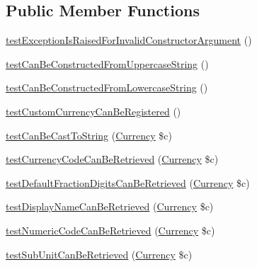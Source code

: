 \subsection*{Public Member Functions}
\begin{DoxyCompactItemize}
\item 
\hyperlink{classSebastianBergmann_1_1Money_1_1CurrencyTest_a17d231f2f0fd7811315590393b549175}{test\+Exception\+Is\+Raised\+For\+Invalid\+Constructor\+Argument} ()
\item 
\hyperlink{classSebastianBergmann_1_1Money_1_1CurrencyTest_ad3be72b37306b9f77812eeec54533606}{test\+Can\+Be\+Constructed\+From\+Uppercase\+String} ()
\item 
\hyperlink{classSebastianBergmann_1_1Money_1_1CurrencyTest_aa82d7dff3050f2a3cd07f5f015796e4d}{test\+Can\+Be\+Constructed\+From\+Lowercase\+String} ()
\item 
\hyperlink{classSebastianBergmann_1_1Money_1_1CurrencyTest_a380803c1311b8fa89696d963835093f2}{test\+Custom\+Currency\+Can\+Be\+Registered} ()
\item 
\hyperlink{classSebastianBergmann_1_1Money_1_1CurrencyTest_ad857c5bc4c304ce75db7b26a26c62a58}{test\+Can\+Be\+Cast\+To\+String} (\hyperlink{classSebastianBergmann_1_1Money_1_1Currency}{Currency} \$c)
\item 
\hyperlink{classSebastianBergmann_1_1Money_1_1CurrencyTest_a8a62f51dfe466c98f757f173e2459d2f}{test\+Currency\+Code\+Can\+Be\+Retrieved} (\hyperlink{classSebastianBergmann_1_1Money_1_1Currency}{Currency} \$c)
\item 
\hyperlink{classSebastianBergmann_1_1Money_1_1CurrencyTest_ae64969e4bab6c78e29fec1d9a63797d7}{test\+Default\+Fraction\+Digits\+Can\+Be\+Retrieved} (\hyperlink{classSebastianBergmann_1_1Money_1_1Currency}{Currency} \$c)
\item 
\hyperlink{classSebastianBergmann_1_1Money_1_1CurrencyTest_a469a205683f76b52e867f94367aec6de}{test\+Display\+Name\+Can\+Be\+Retrieved} (\hyperlink{classSebastianBergmann_1_1Money_1_1Currency}{Currency} \$c)
\item 
\hyperlink{classSebastianBergmann_1_1Money_1_1CurrencyTest_ae3a7cfb35cff2f86660961e02e027ad3}{test\+Numeric\+Code\+Can\+Be\+Retrieved} (\hyperlink{classSebastianBergmann_1_1Money_1_1Currency}{Currency} \$c)
\item 
\hyperlink{classSebastianBergmann_1_1Money_1_1CurrencyTest_a5bf84e253c155387aabd19299c1ea555}{test\+Sub\+Unit\+Can\+Be\+Retrieved} (\hyperlink{classSebastianBergmann_1_1Money_1_1Currency}{Currency} \$c)
\end{DoxyCompactItemize}


